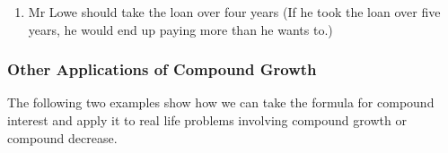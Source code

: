 {\begin{mdframed}[linewidth=4, leftmargin=40, rightmargin=40]
\begin{exercise}
\begin{enumerate}[noitemsep, label=\textbf{Step} \textbf{\arabic*}. ]
{    \par\vspace{12pt}\noindent\begin{minipage}{\columnwidth}
    \parbox[t]{\mymathboxwidth}{\large\begin{math}
    \frac{\mathrm{A}}{\mathrm{P}}={\left(1+i\right)}^{n}\frac{625000}{350000}={\left(1+0,13\right)}^{n}1,785...={\left(1,13\right)}^{n}\mathrm{Try}\phantom{\rule{2pt}{0ex}}n=3:{\left(1,13\right)}^{3}=1,44...\mathrm{Try}\phantom{\rule{2pt}{0ex}}n=4:{\left(1,13\right)}^{4}=1,63...\mathrm{Try}\phantom{\rule{2pt}{0ex}}n=5:{\left(1,13\right)}^{5}=1,84...\end{math}}\hfill
    \parbox[t]{48pt}{\raggedleft 
    (3.30)}
    \end{minipage}\vspace{12pt}\par
    }%
    
        
        \item  
        Mr Lowe should take the loan over four years (If he took the loan over five years, he would end up paying more than he wants to.)
        \end{enumerate}
         

    \end{exercise}
    \end{mdframed}
    }
    \noindent
  
      
      \label{m39334*uid67}
            \subsubsection{ Other Applications of Compound Growth}
            \nopagebreak
            
        
\label{m39334*eip-431}The following two examples show how we can take the formula for compound interest and apply it to real life problems involving compound growth or compound decrease.\par \label{m39334*secfhsst!!!underscore!!!id2915}\vspace{.5cm} 
      

